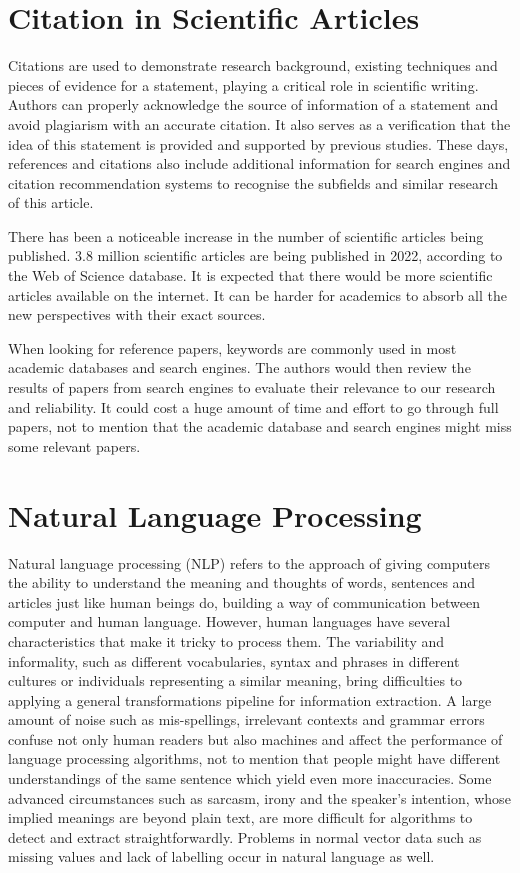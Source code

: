 \section{Citation in Scientific Articles}

Citations are used to demonstrate research background, existing techniques and pieces of evidence for a statement, playing a critical role in scientific writing.
Authors can properly acknowledge the source of information of a statement and avoid plagiarism with an accurate citation.
It also serves as a verification that the idea of this statement is provided and supported by previous studies.
These days, references and citations also include additional information for search engines and citation recommendation systems to recognise the subfields and similar research of this article.

There has been a noticeable increase in the number of scientific articles being published.
3.8 million scientific articles are being published in 2022, according to the Web of Science database.
It is expected that there would be more scientific articles available on the internet.
It can be harder for academics to absorb all the new perspectives with their exact sources.

When looking for reference papers, keywords are commonly used in most academic databases and search engines.
The authors would then review the results of papers from search engines to evaluate their relevance to our research and reliability.
It could cost a huge amount of time and effort to go through full papers, not to mention that the academic database and search engines might miss some relevant papers.


\section{Natural Language Processing}

Natural language processing (NLP) refers to the approach of giving computers the ability to understand the meaning and thoughts of words, sentences and articles just like human beings do, building a way of communication between computer and human language.
However, human languages have several characteristics that make it tricky to process them.
The variability and informality, such as different vocabularies, syntax and phrases in different cultures or individuals representing a similar meaning, bring difficulties to applying a general transformations pipeline for information extraction.
A large amount of noise such as mis-spellings, irrelevant contexts and grammar errors confuse not only human readers but also machines and affect the performance of language processing algorithms, not to mention that people might have different understandings of the same sentence which yield even more inaccuracies.
Some advanced circumstances such as sarcasm, irony and the speaker's intention, whose implied meanings are beyond plain text, are more difficult for algorithms to detect and extract straightforwardly. 
Problems in normal vector data such as missing values and lack of labelling occur in natural language as well.

